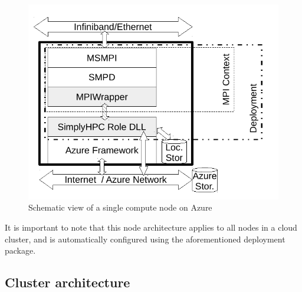 \documentclass[a4paper,twoside]{article}
\begin{document}
\begin{figure}[!h]
	\vspace{-0.2cm}
  \centering
  
	\includegraphics[width=\linewidth]{azureWorkerRole.pdf}
	\caption{Schematic view of a single compute node on Azure}

	\label{fig:schemaRole}
\end{figure}


It is important to note that this node architecture applies to all nodes in a cloud cluster, and is automatically configured using the aforementioned deployment package. 

\subsection{Cluster architecture}
\end{document}
